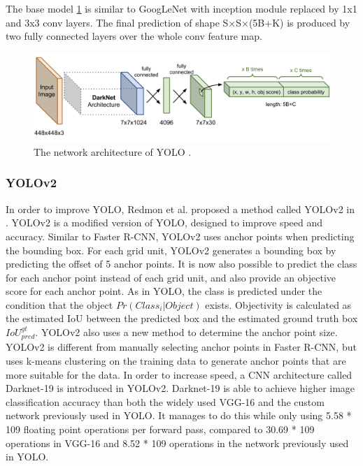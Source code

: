 The base model \ref{fig:yolo-network} is similar to GoogLeNet with inception module replaced by 1x1 and 3x3 conv layers. The final prediction of shape S×S×(5B+K) is produced by two fully connected layers over the whole conv feature map.
\begin{figure}[ht!]
	\centerline{\includegraphics[width=1\linewidth]{Figs/yolo-network.png}}
	\caption{The network architecture of YOLO \cite{DBLP:journals/corr/RedmonDGF15}.}
	\label{fig:yolo-network}
\end{figure}
\subsubsection{YOLOv2}
In order to improve YOLO, Redmon et al. proposed a method called YOLOv2 in \cite{DBLP:journals/corr/RedmonF16}. YOLOv2 is a modified version of YOLO, designed to improve speed and accuracy.
Similar to Faster R-CNN, YOLOv2 uses anchor points when predicting the bounding box. For each grid unit, YOLOv2 generates a bounding box by predicting the offset of 5 anchor points. It is now also possible to predict the class for each anchor point instead of each grid unit, and also provide an objective score for each anchor point. As in YOLO, the class is predicted under the condition that the object \(Pr(Class_i|Object)\) exists. Objectivity is calculated as the estimated IoU between the predicted box and the estimated ground truth box \(IoU_{pred}^{gt}\). YOLOv2 also uses a new method to determine the anchor point size. YOLOv2 is different from manually selecting anchor points in Faster R-CNN, but uses k-means clustering on the training data to generate anchor points that are more suitable for the data.
In order to increase speed, a CNN architecture called Darknet-19 is introduced in YOLOv2. Darknet-19 is able to achieve higher image classification accuracy than both the widely used VGG-16 and the custom network previously used in YOLO. It manages to do this while only using 5.58 * 109 floating point operations per forward pass, compared to 30.69 * 109 operations in VGG-16 and 8.52 * 109 operations in the network previously used in YOLO.
